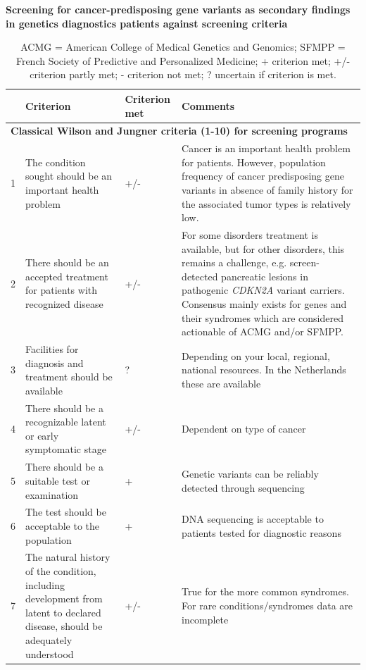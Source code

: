 \begin{table}
	\footnotesize
	\caption[Screening for secondary findings against screening criteria]{\label{table:summary}\textbf{Screening for cancer-predisposing gene variants as secondary findings in genetics diagnostics patients against screening criteria}}
	\begin{tabular}{ p{0.5cm} p{5.5cm} p{2cm} p{7cm} }
		 & \footnotesize{\textbf{Criterion}} & \footnotesize{\textbf{Criterion met}} & \footnotesize{\textbf{Comments}} \\
		\hline
		\multicolumn{4}{l}{\textbf{Classical Wilson and Jungner criteria (1-10) for screening programs \cite{Andermann_2008}}} \\
		\hline
		1 & The condition sought should be an important health problem & +/- & Cancer is an important health problem for patients. However, population frequency of cancer predisposing gene variants in absence of family history for the associated tumor types is relatively low. \\
		2 & There should be an accepted treatment for patients with recognized disease & +/- & For some disorders treatment is available, but for other disorders, this remains a challenge, e.g. screen-detected pancreatic lesions in pathogenic \textsl{CDKN2A} variant carriers. Consensus mainly exists for genes and their syndromes which are considered actionable of ACMG and/or SFMPP. \\
		3 & Facilities for diagnosis and treatment should be available & ? & Depending on your local, regional, national resources. In the Netherlands these are available \\
		4 & There should be a recognizable latent or early symptomatic stage & +/- & Dependent on type of cancer \\
		5 & There should be a suitable test or examination& + & Genetic variants can be reliably detected through sequencing \\
		6 & The test should be acceptable to the population & + & DNA sequencing is acceptable to patients tested for diagnostic reasons \\
		7 & The natural history of the condition, including development from latent to declared disease, should be adequately understood & +/- & True for the more common syndromes. For rare conditions/syndromes data are incomplete \\
		\hline
	\end{tabular}
	\caption*{ACMG = American College of Medical Genetics and Genomics; SFMPP = French Society of Predictive and Personalized Medicine; + criterion met; +/- criterion partly met; - criterion not met; ? uncertain if criterion is met.}
\end{table}

